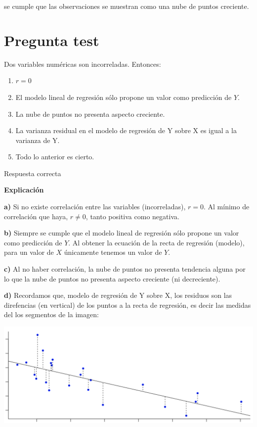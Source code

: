 \documentclass[
]{book}
\providecommand{\tightlist}{%
  \setlength{\itemsep}{0pt}\setlength{\parskip}{0pt}}
\begin{document}
se cumple que las observaciones se muestran como una nube de puntos creciente.

\hypertarget{pregunta-test-125}{%
\section{Pregunta test}\label{pregunta-test-125}}

Dos variables numéricas son incorreladas. Entonces:

\begin{enumerate}
\def\labelenumi{\alph{enumi})}
\tightlist
\item
  \(r = 0\)
\item
  El modelo lineal de regresión sólo propone un valor como predicción de \(Y\).
\item
  La nube de puntos no presenta aspecto creciente.
\item
  La varianza residual en el modelo de regresión de Y sobre X es igual a la varianza de Y.
\item
  Todo lo anterior es cierto.
\end{enumerate}

Respuesta correcta

\textbf{Explicación}

\textbf{a)} Si no existe correlación entre las variables (incorreladas), \(r=0\). Al mínimo de correlación que haya, \(r \neq 0\), tanto positiva como negativa.

\textbf{b)} Siempre se cumple que el modelo lineal de regresión sólo propone un valor como predicción de \(Y\). Al obtener la ecuación de la recta de regresión (modelo), para un valor de \(X\) únicamente tenemos un valor de \(Y\).

\textbf{c)} Al no haber correlación, la nube de puntos no presenta tendencia alguna por lo que la nube de puntos no presenta aspecto creciente (ni decreciente).

\textbf{d)} Recordamos que, modelo de regresión de Y sobre X, los residuos son las direfencias (en vertical) de los puntos a la recta de regresión, es decir las medidas del los segmentos de la imagen:

\includegraphics[width=23.72in]{img/4_2}
\end{document}
